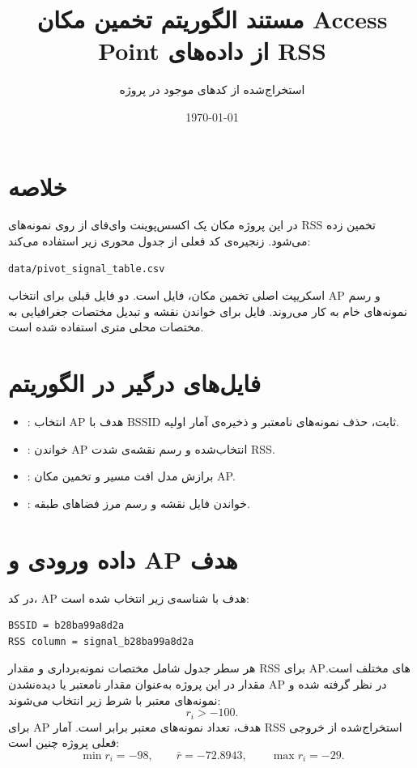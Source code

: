 \documentclass[12pt,a4paper]{article}
\title{مستند الگوریتم تخمین مکان Access Point از داده‌های RSS}
\author{استخراج‌شده از کدهای موجود در پروژه}
\date{\today}
\begin{document}
\maketitle
\tableofcontents
\newpage

\section{خلاصه}
در این پروژه مکان یک اکسس‌پوینت وای‌فای از روی نمونه‌های RSS تخمین زده می‌شود.
زنجیره‌ی کد فعلی از جدول محوری زیر استفاده می‌کند:
\begin{latin}
\begin{verbatim}
data/pivot_signal_table.csv
\end{verbatim}
\end{latin}
اسکریپت اصلی تخمین مکان، فایل
است. دو فایل قبلی برای انتخاب AP و رسم نمونه‌های خام به کار می‌روند.
فایل
برای خواندن نقشه و تبدیل مختصات جغرافیایی به مختصات محلی متری استفاده شده است.

\section{فایل‌های درگیر در الگوریتم}
\begin{itemize}
  \item {}: انتخاب AP هدف با BSSID ثابت، حذف نمونه‌های نامعتبر و ذخیره‌ی آمار اولیه.
  \item {}: خواندن AP انتخاب‌شده و رسم نقشه‌ی شدت RSS.
  \item {}: برازش مدل افت مسیر و تخمین مکان AP.
  \item {}: خواندن فایل نقشه و رسم مرز فضاهای طبقه.
\end{itemize}

\section{داده ورودی و AP هدف}
در کد، AP هدف با شناسه‌ی زیر انتخاب شده است:
\begin{latin}
\begin{verbatim}
BSSID = b28ba99a8d2a
RSS column = signal_b28ba99a8d2a
\end{verbatim}
\end{latin}
هر سطر جدول شامل مختصات نمونه‌برداری
و مقدار RSS برای APهای مختلف است. مقدار
در این پروژه به‌عنوان مقدار نامعتبر یا دیده‌نشدن AP در نظر گرفته شده و نمونه‌های معتبر با شرط زیر انتخاب می‌شوند:
\[
r_i > -100.
\]
برای AP هدف، تعداد نمونه‌های معتبر برابر
است. آمار RSS استخراج‌شده از خروجی فعلی پروژه چنین است:
\[
\min r_i=-98,\qquad
\bar r=-72.8943,\qquad
\max r_i=-29.
\]
\end{document}
